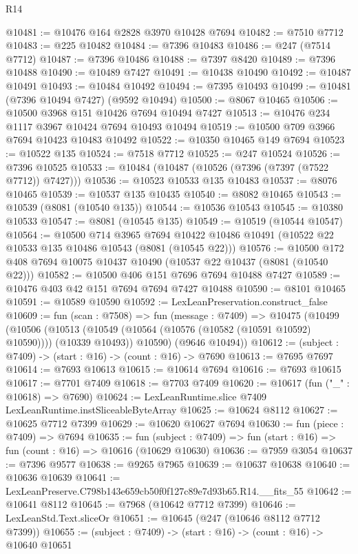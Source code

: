 \begin{lexlean}{R14}
\begin{coremodule}
@10481 := @10476 @164 @2828 @3970 @10428 @7694
@10482 := @7510 @7712
@10483 := @225 @10482
@10484 := @7396 @10483
@10486 := @247 (@7514 @7712)
@10487 := @7396 @10486
@10488 := @7397 @8420
@10489 := @7396 @10488
@10490 := @10489 @7427
@10491 := @10438 @10490
@10492 := @10487 @10491
@10493 := @10484 @10492
@10494 := @7395 @10493
@10499 := @10481 (@7396 @10494 @7427) (@9592 @10494)
@10500 := @8067 @10465
@10506 := @10500 @3968 @151 @10426 @7694 @10494 @7427
@10513 := @10476 @234 @1117 @3967 @10424 @7694 @10493 @10494
@10519 := @10500 @709 @3966 @7694 @10423 @10483 @10492
@10522 := @10350 @10465 @149 @7694
@10523 := @10522 @135
@10524 := @7518 @7712
@10525 := @247 @10524
@10526 := @7396 @10525
@10533 := @10484 (@10487 (@10526 (@7396 (@7397 (@7522 @7712)) @7427)))
@10536 := @10523 @10533 @135 @10483
@10537 := @8076 @10465
@10539 := @10537 @135 @10435
@10540 := @8082 @10465
@10543 := @10539 (@8081 (@10540 @135))
@10544 := @10536 @10543
@10545 := @10380 @10533
@10547 := @8081 (@10545 @135)
@10549 := @10519 (@10544 @10547)
@10564 := @10500
    @714
    @3965
    @7694
    @10422
    @10486
    @10491
    (@10522 @22 @10533 @135 @10486 @10543 (@8081 (@10545 @22)))
@10576 := @10500 @172 @408 @7694 @10075 @10437 @10490 (@10537 @22 @10437 (@8081 (@10540 @22)))
@10582 := @10500 @406 @151 @7696 @7694 @10488 @7427
@10589 := @10476 @403 @42 @151 @7694 @7694 @7427 @10488
@10590 := @8101 @10465
@10591 := @10589 @10590
@10592 := LexLeanPreservation.construct_false
@10609 := fun (scan : @7508) =>
  fun (message : @7409) =>
  @10475
    (@10499
      (@10506
        (@10513 (@10549 (@10564 (@10576 (@10582 (@10591 @10592) @10590)))) (@10339 @10493))
        @10590)
      (@9646 @10494))
@10612 := (subject : @7409) -> (start : @16) -> (count : @16) -> @7690
@10613 := @7695 @7697
@10614 := @7693 @10613
@10615 := @10614 @7694
@10616 := @7693 @10615
@10617 := @7701 @7409
@10618 := @7703 @7409
@10620 := @10617 (fun ("_" : @10618) => @7690)
@10624 := LexLeanRuntime.slice @7409 LexLeanRuntime.instSliceableByteArray
@10625 := @10624 @8112
@10627 := @10625 @7712 @7399
@10629 := @10620 @10627 @7694
@10630 := fun (piece : @7409) => @7694
@10635 := fun (subject : @7409) => fun (start : @16) => fun (count : @16) => @10616 (@10629 @10630)
@10636 := @7959 @3054
@10637 := @7396 @9577
@10638 := @9265 @7965
@10639 := @10637 @10638
@10640 := @10636 @10639
@10641 := LexLeanPreserve.C798b143e659cb50f0f127c89e7d93b65.R14.__fits_55
@10642 := @10641 @8112
@10645 := @7968 (@10642 @7712 @7399)
@10646 := LexLeanStd.Text.sliceOr
@10651 := @10645 (@247 (@10646 @8112 @7712 @7399))
@10655 := (subject : @7409) -> (start : @16) -> (count : @16) -> @10640 @10651

\end{coremodule}
\end{lexlean}
